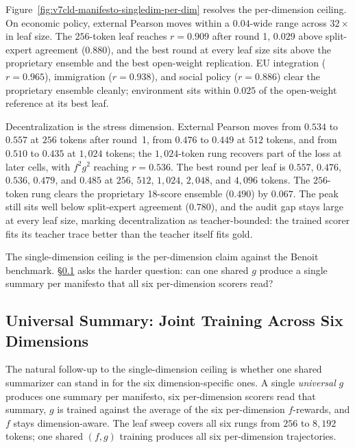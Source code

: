 Figure~\ref{fig:v7cld-manifesto-singledim-per-dim} resolves the
per-dimension ceiling. On economic policy, external Pearson moves within a
$0.04$-wide range across $32\times$ in leaf size. The $256$-token leaf
reaches $r=0.909$ after round 1, $0.029$ above split-expert agreement
($0.880$), and the best round at every leaf size sits above the proprietary
ensemble and the best open-weight replication. EU integration ($r=0.965$),
immigration ($r=0.938$), and social policy ($r=0.886$) clear the
proprietary ensemble cleanly; environment sits within $0.025$ of the
open-weight reference at its best leaf.

Decentralization is the stress dimension. External Pearson moves from
$0.534$ to $0.557$ at $256$ tokens after round~1, from $0.476$ to $0.449$
at $512$ tokens, and from $0.510$ to $0.435$ at $1{,}024$ tokens; the
$1{,}024$-token rung recovers part of the loss at later cells, with
$f^2g^2$ reaching $r=0.536$. The best round per leaf is $0.557$, $0.476$,
$0.536$, $0.479$, and $0.485$ at $256$, $512$, $1{,}024$, $2{,}048$, and
$4{,}096$ tokens. The $256$-token rung clears the proprietary 18-score
ensemble ($0.490$) by $0.067$. The peak still sits well below split-expert
agreement ($0.780$), and the audit gap stays large at every leaf size,
marking decentralization as teacher-bounded: the trained scorer fits its
teacher trace better than the teacher itself fits gold.

The single-dimension ceiling is the per-dimension claim against the Benoit
benchmark. \S\ref{sec:min-manifesto-universal-summary} asks the harder
question: can one shared $g$ produce a single summary per manifesto that all
six per-dimension scorers read?

\subsection{Universal Summary: Joint Training Across Six Dimensions}\label{sec:min-manifesto-universal-summary}

The natural follow-up to the single-dimension ceiling is whether one shared
summarizer can stand in for the six dimension-specific ones. A single
\emph{universal} $g$ produces one summary per manifesto, six per-dimension
scorers read that summary, $g$ is trained against the average of the six
per-dimension $f$-rewards, and $f$ stays dimension-aware. The leaf sweep
covers all six rungs from $256$ to $8{,}192$ tokens; one shared $(f, g)$
training produces all six per-dimension trajectories.

